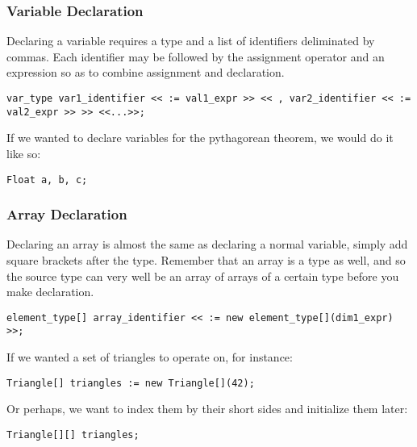\subsubsection{Variable Declaration}
Declaring a variable requires a type and a list of identifiers deliminated by commas. Each identifier may be followed by the assignment operator and an expression so as to combine assignment and declaration.

\begin{lstlisting}
var_type var1_identifier << := val1_expr >> << , var2_identifier << := val2_expr >> >> <<...>>;
\end{lstlisting}

If we wanted to declare variables for the pythagorean theorem, we would do it like so:

\begin{lstlisting}[caption=Variable Initialization for the Pythagorean Theorem,backgroundcolor=\color{tintedorange}]
Float a, b, c;
\end{lstlisting}

\subsubsection{Array Declaration}
Declaring an array is almost the same as declaring a normal variable, simply add square brackets after the type. Remember that an array is a type as well, and so the source type can very well be an array of arrays of a certain type before you make declaration.

\begin{lstlisting}
element_type[] array_identifier << := new element_type[](dim1_expr) >>;
\end{lstlisting}

If we wanted a set of triangles to operate on, for instance:

\begin{lstlisting}[caption=Array Declaration and Instantiation of Many Triangles, backgroundcolor=\color{tintedorange}]
Triangle[] triangles := new Triangle[](42);
\end{lstlisting}

Or perhaps, we want to index them by their short sides and initialize them later:

\begin{lstlisting}[caption=Array Declaration of a 2-Degree Triangle Array,backgroundcolor=\color{tintedorange}]
Triangle[][] triangles;
\end{lstlisting}

